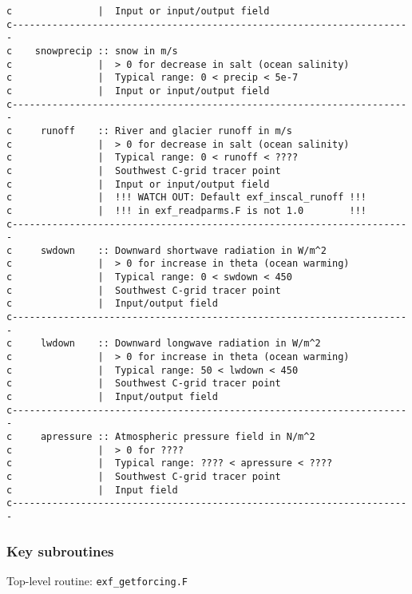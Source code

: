 {\begin{verbatim}
c               |  Input or input/output field
c----------------------------------------------------------------------
c    snowprecip :: snow in m/s
c               |  > 0 for decrease in salt (ocean salinity)
c               |  Typical range: 0 < precip < 5e-7
c               |  Input or input/output field
c----------------------------------------------------------------------
c     runoff    :: River and glacier runoff in m/s
c               |  > 0 for decrease in salt (ocean salinity)
c               |  Typical range: 0 < runoff < ????
c               |  Southwest C-grid tracer point
c               |  Input or input/output field
c               |  !!! WATCH OUT: Default exf_inscal_runoff !!!
c               |  !!! in exf_readparms.F is not 1.0        !!!
c----------------------------------------------------------------------
c     swdown    :: Downward shortwave radiation in W/m^2
c               |  > 0 for increase in theta (ocean warming)
c               |  Typical range: 0 < swdown < 450
c               |  Southwest C-grid tracer point
c               |  Input/output field
c----------------------------------------------------------------------
c     lwdown    :: Downward longwave radiation in W/m^2
c               |  > 0 for increase in theta (ocean warming)
c               |  Typical range: 50 < lwdown < 450
c               |  Southwest C-grid tracer point
c               |  Input/output field
c----------------------------------------------------------------------
c     apressure :: Atmospheric pressure field in N/m^2
c               |  > 0 for ????
c               |  Typical range: ???? < apressure < ????
c               |  Southwest C-grid tracer point
c               |  Input field
c----------------------------------------------------------------------

\end{verbatim}
}


\subsubsection{Key subroutines
\label{sec:pkg:exf:subroutines}}

Top-level routine: \texttt{exf\_getforcing.F}

